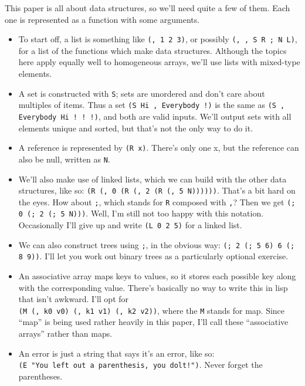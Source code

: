 \documentclass{article}
\newcommand{\code}[1]{\lstinline`#1`}
\begin{document}
This paper is all about data structures, so we'll need quite a few of them. Each one is represented as a function with some arguments.
\begin{itemize}
\item To start off, a list is something like \code{(, 1 2 3)}, or possibly \code{(, , S R ; N L)}, for a list of the functions which make data structures. Although the topics here apply equally well to homogeneous arrays, we'll use lists with mixed-type elements.
\item A set is constructed with \code{S}; sets are unordered and don't care about multiples of items. Thus a set \code{(S Hi , Everybody !)} is the same as \code{(S , Everybody Hi ! ! !)}, and both are valid inputs. We'll output sets with all elements unique and sorted, but that's not the only way to do it.
\item A reference is represented by \code{(R x)}. There's only one x, but the reference can also be null, written as \code{N}.
\item We'll also make use of linked lists, which we can build with the other data structures, like so: \code{(R (, 0 (R (, 2 (R (, 5 N))))))}. That's a bit hard on the eyes. How about \code{;}, which stands for \code{R} composed with \code{,}? Then we get \code{(; 0 (; 2 (; 5 N)))}. Well, I'm still not too happy with this notation. Occasionally I'll give up and write \code{(L 0 2 5)} for a linked list.
\item We can also construct trees using \code{;}, in the obvious way: \code{(; 2 (; 5 6) 6 (; 8 9))}. I'll let you work out binary trees as a particularly optional exercise.
\item An associative array maps keys to values, so it stores each possible key along with the corresponding value. There's basically no way to write this in lisp that isn't awkward. I'll opt for \\\code{(M (, k0 v0) (, k1 v1) (, k2 v2))}, where the \code{M} stands for map. Since ``map'' is being used rather heavily in this paper, I'll call these ``associative arrays'' rather than maps.
\item An error is just a string that says it's an error, like so: \\\code{(E "You left out a parenthesis, you dolt!")}. Never forget the parentheses.
\end{itemize}
\end{document}
